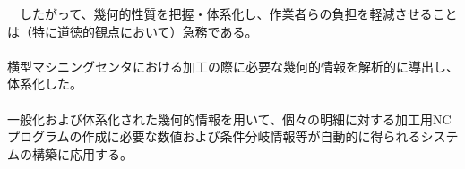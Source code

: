 {　したがって、幾何的性質を把握・体系化し、作業者らの負担を軽減させることは（特に道徳的観点において）急務である。
}{%
\paragraph*{\tpartconclusion}
横型マシニングセンタにおける加工の際に必要な幾何的情報を解析的に導出し、体系化した。
\tcbline*
\paragraph*{\tpartnextstep}
一般化および体系化された幾何的情報を用いて、個々の明細に対する加工用NCプログラムの作成に必要な数値および条件分岐情報等が自動的に得られるシステムの構築に応用する。
}














\begin{appendices}
\Appendixpart



{\small}
\end{appendices}

